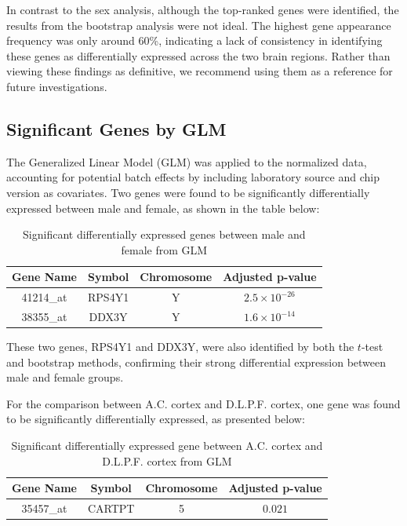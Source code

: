 \documentclass[12pt]{article}
\begin{document}
In contrast to the sex analysis, although the top-ranked genes were identified, the results from the bootstrap analysis were not ideal. The highest gene appearance frequency was only around 60\%, indicating a lack of consistency in identifying these genes as differentially expressed across the two brain regions. Rather than viewing these findings as definitive, we recommend using them as a reference for future investigations.

\subsection{Significant Genes by GLM}

The Generalized Linear Model (GLM) was applied to the normalized data, accounting for potential batch effects by including laboratory source and chip version as covariates. Two genes were found to be significantly differentially expressed between male and female, as shown in the table below:

\begin{table}[h!]
\centering
\begin{tabular}{|c|c|c|c|}
\hline
\textbf{Gene Name} & \textbf{Symbol} & \textbf{Chromosome} & \textbf{Adjusted p-value} \\
\hline
41214\_at & RPS4Y1 & Y & $2.5 \times 10^{-26}$ \\
38355\_at & DDX3Y & Y & $1.6 \times 10^{-14}$ \\
\hline
\end{tabular}
\caption{Significant differentially expressed genes between male and female from GLM}
\end{table}

These two genes, RPS4Y1 and DDX3Y, were also identified by both the $t$-test and bootstrap methods, confirming their strong differential expression between male and female groups.

For the comparison between A.C. cortex and D.L.P.F. cortex, one gene was found to be significantly differentially expressed, as presented below:

\begin{table}[h!]
\centering
\begin{tabular}{|c|c|c|c|}
\hline
\textbf{Gene Name} & \textbf{Symbol} & \textbf{Chromosome} & \textbf{Adjusted p-value} \\
\hline
35457\_at & CARTPT & 5 & $0.021$ \\
\hline
\end{tabular}
\caption{Significant differentially expressed gene between A.C. cortex and D.L.P.F. cortex from GLM}
\end{table}
\end{document}
